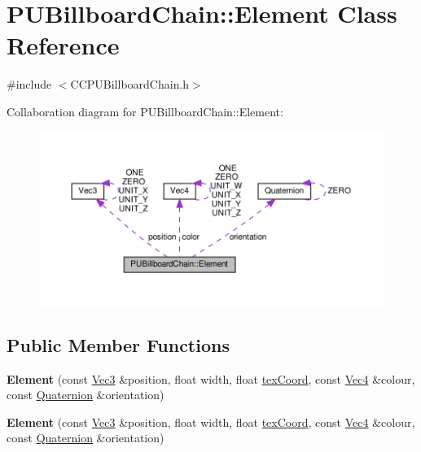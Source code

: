\hypertarget{classPUBillboardChain_1_1Element}{}\section{P\+U\+Billboard\+Chain\+:\+:Element Class Reference}
\label{classPUBillboardChain_1_1Element}


{\ttfamily \#include $<$C\+C\+P\+U\+Billboard\+Chain.\+h$>$}



Collaboration diagram for P\+U\+Billboard\+Chain\+:\+:Element\+:
\nopagebreak
\begin{figure}[H]
\begin{center}
\leavevmode
\includegraphics[width=350pt]{classPUBillboardChain_1_1Element__coll__graph}
\end{center}
\end{figure}
\subsection*{Public Member Functions}
\begin{DoxyCompactItemize}
\item 
\mbox{\label{classPUBillboardChain_1_1Element_afd43feafce8e931c83bfd9cfc6ea2f64}} 
{\bfseries Element} (const \hyperlink{classVec3}{Vec3} \&position, float width, float \hyperlink{classPUBillboardChain_1_1Element_a08c1434697d6cefc5e8b62017c52a0b2}{tex\+Coord}, const \hyperlink{classVec4}{Vec4} \&colour, const \hyperlink{classQuaternion}{Quaternion} \&orientation)
\item 
\mbox{\label{classPUBillboardChain_1_1Element_afd43feafce8e931c83bfd9cfc6ea2f64}} 
{\bfseries Element} (const \hyperlink{classVec3}{Vec3} \&position, float width, float \hyperlink{classPUBillboardChain_1_1Element_a08c1434697d6cefc5e8b62017c52a0b2}{tex\+Coord}, const \hyperlink{classVec4}{Vec4} \&colour, const \hyperlink{classQuaternion}{Quaternion} \&orientation)
\end{DoxyCompactItemize}
